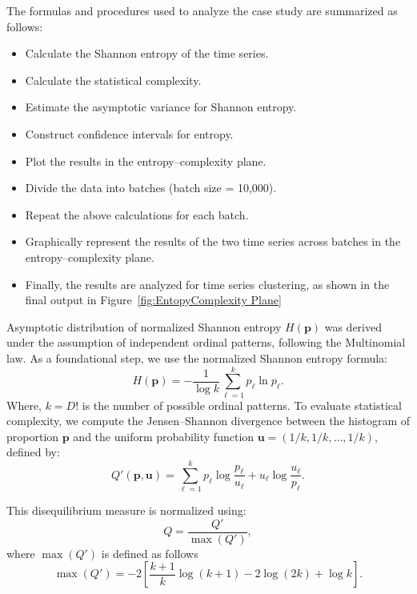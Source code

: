 The formulas and procedures used to analyze the case study are summarized as follows:
\begin{itemize}
	\item Calculate the Shannon entropy of the time series.
	\item Calculate the statistical complexity.
	\item Estimate the asymptotic variance for Shannon entropy.
	\item Construct confidence intervals for entropy.
	\item Plot the results in the entropy–complexity plane.
	\item Divide the data into batches (batch size = 10,000).
	\item Repeat the above calculations for each batch.
	\item Graphically represent the results of the two time series across batches in the entropy–complexity plane.
	\item Finally, the results are analyzed for time series clustering, as shown in the final output in Figure~\ref{fig:EntopyComplexity Plane}
\end{itemize}


Asymptotic distribution of normalized Shannon entropy $H(\mathbf{p})$ was derived under the assumption of independent ordinal patterns, following the Multinomial law. As a foundational step, we use the normalized Shannon entropy formula: 
\begin{equation}
	H(\mathbf{p})=-\dfrac{1}{\log k}\sum^{k}_{\ell=1}p_{\ell} \ln{p_{\ell}}.
\end{equation}
Where, $k=D!$ is the number of possible ordinal patterns. To evaluate statistical complexity, we compute the Jensen–Shannon divergence between the histogram of proportion $\mathbf{p}$ and the uniform probability function $\mathbf{u}=(1/k, 1/k, \dots, 1/k)$, defined by:  
\begin{equation}
	Q'(\mathbf{p,u})=\sum^k_{\ell=1} p_\ell\log\dfrac{p_\ell}{u_\ell}+u_\ell\log\dfrac{u_\ell}{p_\ell}.
\end{equation}

This disequilibrium measure is normalized using:
\begin{equation}
	Q=\dfrac{Q'}{\max{(Q')}},
\end{equation}
where $\max(Q')$ is defined as follows
\begin{equation}
	\max(Q')=-2 \left[\dfrac{k+1}{k}\log(k+1)-2\log(2k)+\log k\right].
\end{equation}

